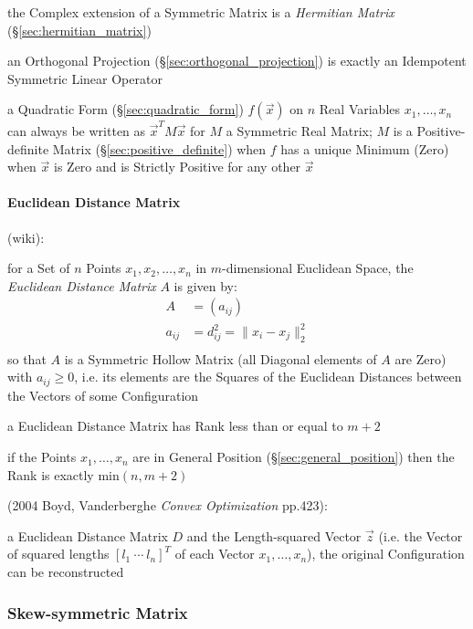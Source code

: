 the Complex extension of a Symmetric Matrix is a \emph{Hermitian Matrix}
(\S\ref{sec:hermitian_matrix})

an Orthogonal Projection (\S\ref{sec:orthogonal_projection}) is exactly an
Idempotent Symmetric Linear Operator

a Quadratic Form (\S\ref{sec:quadratic_form}) $f(\vec{x})$ on $n$ Real
Variables $x_1,\ldots,x_n$ can always be written as $\vec{x}^T M \vec{x}$ for
$M$ a Symmetric Real Matrix;
$M$ is a Positive-definite Matrix (\S\ref{sec:positive_definite}) when $f$ has
a unique Minimum (Zero) when $\vec{x}$ is Zero and is Strictly Positive for any
other $\vec{x}$



\paragraph{Euclidean Distance Matrix}\label{sec:euclidean_distance_matrix}\hfill

(wiki):

for a Set of $n$ Points $x_1, x_2, \ldots, x_n$ in $m$-dimensional Euclidean
Space, the \emph{Euclidean Distance Matrix} $A$ is given by:
\begin{align*}
  A      & = (a_{ij}) \\
  a_{ij} & = d_{ij}^2 = \|x_i - x_j\|_2^2 \\
\end{align*}
so that $A$ is a Symmetric Hollow Matrix (all Diagonal elements of $A$ are
Zero) with $a_{ij} \geq 0$, i.e. its elements are the Squares of the Euclidean
Distances between the Vectors of some Configuration

a Euclidean Distance Matrix has Rank less than or equal to $m+2$

if the Points $x_1, \ldots, x_n$ are in General Position
(\S\ref{sec:general_position}) then the Rank is exactly $\mathrm{min}(n,m+2)$

(2004 Boyd, Vanderberghe \emph{Convex Optimization} pp.423):

a Euclidean Distance Matrix $D$ and the Length-squared Vector $\vec{z}$ (i.e.
the Vector of squared lengths $[l_1 \ \cdots \ l_n]^T$ of each Vector $x_1,
\ldots, x_n$), the original Configuration can be reconstructed



\subsubsection{Skew-symmetric Matrix}\label{sec:skew_symmetric}

